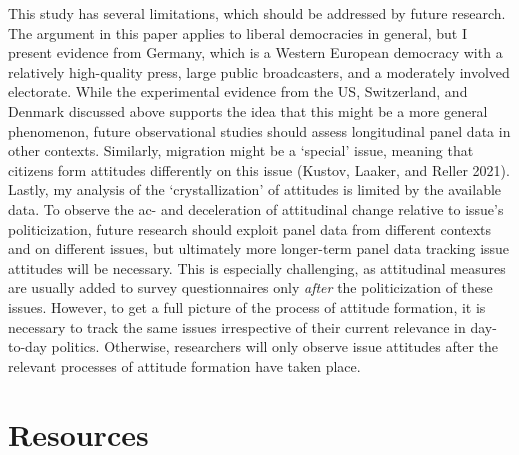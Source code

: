 \documentclass[
  12pt,
]{article}
\begin{document}
This study has several limitations, which should be addressed by future research. The argument in this paper applies to liberal democracies in general, but I present evidence from Germany, which is a Western European democracy with a relatively high-quality press, large public broadcasters, and a moderately involved electorate. While the experimental evidence from the US, Switzerland, and Denmark discussed above supports the idea that this might be a more general phenomenon, future observational studies should assess longitudinal panel data in other contexts. Similarly, migration might be a `special' issue, meaning that citizens form attitudes differently on this issue (Kustov, Laaker, and Reller 2021). Lastly, my analysis of the `crystallization' of attitudes is limited by the available data. To observe the ac- and deceleration of attitudinal change relative to issue's politicization, future research should exploit panel data from different contexts and on different issues, but ultimately more longer-term panel data tracking issue attitudes will be necessary. This is especially challenging, as attitudinal measures are usually added to survey questionnaires only \emph{after} the politicization of these issues. However, to get a full picture of the process of attitude formation, it is necessary to track the same issues irrespective of their current relevance in day-to-day politics. Otherwise, researchers will only observe issue attitudes after the relevant processes of attitude formation have taken place.

\pagebreak

\hypertarget{resources}{%
\section*{Resources}\label{resources}}
\end{document}
